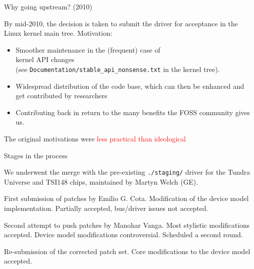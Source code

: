 \documentclass[compress,red]{beamer}
\begin{document}
\begin{frame}{Why going upstream? (2010)}

By mid-2010, the decision is taken to submit the driver for acceptance
in the Linux kernel main tree. Motivation:

\begin{itemize}
\item Smoother maintenance in the (frequent) case of\\
	kernel API changes\\
  (see \texttt{Documentation/stable\_api\_nonsense.txt} in the kernel
  tree).
\item Widespread distribution of the code base, which can then be
    enhanced and get contributed by researchers
\item Contributing back in return to the many benefits the FOSS community
    gives us.
\end{itemize}
The original motivations were \textcolor{red}{less practical than ideological}
\end{frame}

\begin{frame}{Stages in the process}

We underwent the merge with the pre-existing \texttt{./staging/}
driver for the Tundra Universe and TSI148 chips,
maintained by Martyn Welch (GE).

\begin{description}
\pause
\item[nov 2010] First submission of patches by Emilio G. Cota.
    Modification of the device model implementation. Partially accepted,
    bus/driver issues not accepted.
\pause
\item[march 2011] Second attempt to push patches by Manohar Vanga.
    Most stylistic modifications accepted. Device model modifications
    controversial. Scheduled a second round.
\pause
\item[mid 2011] Re-submission of the corrected patch set. Core
    modifications to the device model accepted.
\end{description}
\end{frame}
\end{document}
